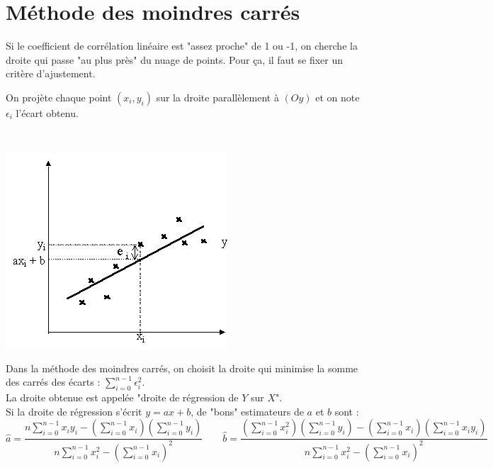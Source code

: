 \section{M\' ethode des moindres carr\' es}
\noindent Si le coefficient de corr\' elation lin\' eaire est "assez proche" de 1 ou -1, on cherche la droite qui passe "au plus pr\` es" du nuage de points. Pour \c ca, il faut se fixer un crit\` ere d'ajustement. \\
\begin{minipage}{0.5\textwidth}
On proj\` ete chaque point $(x_i,y_i)$ sur la droite parall\` element \` a $(Oy)$ et on note $\epsilon_i$ l'\' ecart obtenu. 
\end{minipage}
$\quad$
\begin{minipage}{0.9\textwidth}
\includegraphics[scale=0.5]{Dessin/projection}
\end{minipage}

\noindent Dans la m\' ethode des moindres carr\' es, on choisit la droite qui minimise la somme des carr\' es des \' ecarts : $\displaystyle\sum_{i=0}^{n-1} \epsilon_i^2$. \\
La droite obtenue est appel\' ee "droite de r\' egression de $Y$ sur $X$".\\
Si la droite de r\' egression s'\' ecrit $y=ax+b$, de "bons" estimateurs de $a$ et $b$ sont :
 \[\hat{a}=\dfrac{n\displaystyle\sum_{i=0}^{n-1}  x_iy_i-\left(\displaystyle\sum_{i=0}^{n-1}   x_i\right)\left(\displaystyle\sum_{i=0}^{n-1}   y_i\right)}{n\displaystyle\sum_{i=0}^{n-1}   x_i^2-\left(\displaystyle\sum_{i=0}^{n-1}   x_i\right)^2}\qquad \hat{b}=\dfrac{\left(\displaystyle\sum_{i=0}^{n-1}  x_i^2\right)\left(\displaystyle\sum_{i=0}^{n-1}  y_i\right)-\left(\displaystyle\sum_{i=0}^{n-1}   x_i\right)\left(\displaystyle\sum_{i=0}^{n-1}   x_i y_i\right)}{n\displaystyle\sum_{i=0}^{n-1}   x_i^2-\left(\displaystyle\sum_{i=0}^{n-1}   x_i\right)^2}\]

